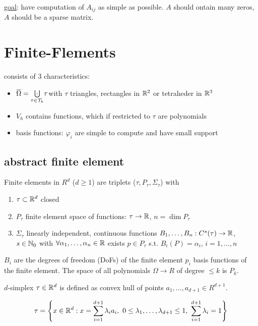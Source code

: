 \underline{goal}: have computation of $A_{ij}$ as simple as possible. $A$ should ontain many zeros, $A$ should be a sparse matrix.

\section{Finite-Flements}
consists of 3 characteristics:
\begin{itemize}
	\item $\overline{\Omega}= \underset{\tau \in \T_h}{\bigcupdot} \tau$\quad  with $\tau$ triangles, rectangles in $\mathbb{R}^2$ or tetraheder in $\mathbb{R}^3$
	
		
	
	\item $V_h$ contains functions, which if restricted to $\tau$ are polynomials
	\item basis functions: $\varphi_i$ are simple to compute and have small support
\end{itemize}
\subsection{abstract finite element}
\begin{definition_}
	Finite elements in $R^d$ ($d\geq 1$) are triplets ($\tau,P_{\tau},\Sigma_{\tau}$) with 
	\begin{enumerate}[label=(\roman*)]
		\item $\tau \subset \mathbb{R}^d$ closed
		\item $P_{\tau}$ finite element space of functions: $\tau \to \mathbb{R}$, $n = \dim P_{\tau}$
		\item $\Sigma_{\tau}$ linearly independent, continuous functions $B_1,\dots,B_n:C^s(\tau) \to \mathbb{R}$, $s \in \mathbb{N}_0$ with $\forall \alpha_1, \dots, \alpha_n \in \mathbb{R}$ exists $p \in P_{\tau}$ s.t. $B_i (P) = \alpha_i$, $i = 1, \dots,n$
	\end{enumerate}
\end{definition_}
$B_i$ are the degrees of freedom (DoFs) of the finite element $p_i$ basis functions of the finite element. The space of all polynomials $\Omega \to R$ of degree $\leq k$ is $P_k$.

$d$-simplex $\tau \in \mathbb{R}^d$ is defined as convex hull of points $a_1,\dots,a_{d+1}\in R^{d+1}$.

\begin{equation*}
	\tau = \left\{ x\in \mathbb{R}^d: x= \displaystyle \sum^{d+1}_{i=1} \lambda_ia_i,\ 0 \leq \lambda_1, \dots,\lambda_{d+1}\leq 1,\ \displaystyle \sum^{d+1}_{i=1} \lambda_i =1\right\}
\end{equation*}

